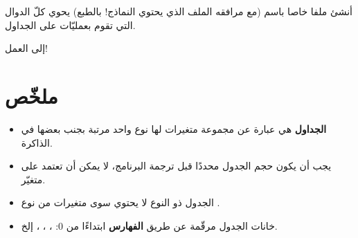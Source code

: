 \begin{information}
أنشئ ملفا خاصا باسم
(مع مرافقه الملف
الذي يحتوي النماذج! بالطبع) يحوي كلّ الدوال التي تقوم بعمليّات على الجداول.
\end{information}

إلى العمل!

\section*{ملخّص}

\begin{itemize}
  \item \textbf{الجداول}
هي عبارة عن مجموعة متغيرات لها نوع واحد مرتبة بجنب بعضها في الذاكرة.
  \item يجب أن يكون حجم الجدول محددًا قبل ترجمة البرنامج، لا يمكن أن تعتمد على متغيّر.
  \item الجدول ذو النوع
لا يحتوي سوى متغيرات من نوع
.
  \item خانات الجدول مرقّمة عن طريق
\textbf{الفهارس}
ابتداءًا من 0:
، ، ،
إلخ.
\end{itemize}
